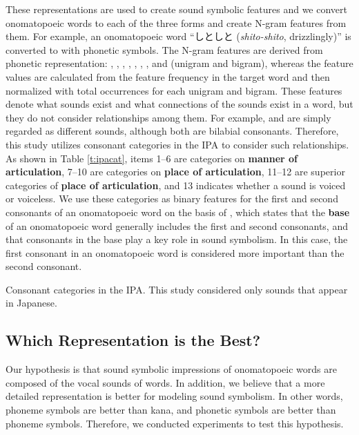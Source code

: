 \documentclass[english]{jnlp_1.4}
\begin{document}
These representations are used to create sound symbolic features and
we convert onomatopoeic words to each of the three forms and create N-gram features from them.
For example, an onomatopoeic word ``しとしと ({\it shito-shito}, drizzlingly)'' is converted to \textipa{[SitoSito]} with phonetic symbols.
The N-gram features are derived from phonetic representation:
\textipa{[S]}, \textipa{[i]}, \textipa{[t]}, \textipa{[o]}, \textipa{[Si]}, \textipa{[it]}, \textipa{[to]}, and \textipa{[oS]} (unigram and bigram),
whereas the feature values are calculated from the feature frequency in the target word and then normalized with total occurrences for each unigram and bigram.
These features denote what sounds exist and what connections of the sounds exist in a word, but they do not consider relationships among them.
For example, \textipa{[m]} and \textipa{[p]} are simply regarded as different sounds, although both are bilabial consonants.
Therefore, this study utilizes consonant categories in the IPA to consider such relationships.
As shown in Table \ref{t:ipacat}, items 1--6 are categories on {\bf manner of articulation}, 7--10 are categories on {\bf place of articulation},
11--12 are superior categories of {\bf place of articulation}, and 13 indicates whether a sound is voiced or voiceless.
We use these categories as binary features for the first and second consonants of an onomatopoeic word on the basis of \cite{hamano1998}, which states that
the {\bf base} of an onomatopoeic word generally includes the first and second consonants, and that consonants in the base play a key role in sound symbolism.
In this case, the first consonant in an onomatopoeic word is considered more important than the second consonant.

\begin{table}[t]
\caption{Consonant categories in the IPA. This study considered only sounds that appear in Japanese.}
\label{t:ipacat}

\end{table}


\subsection{Which Representation is the Best?}
\label{s:ssm}

Our hypothesis is that sound symbolic impressions of onomatopoeic words are composed of the vocal sounds of words.
In addition, we believe that a more detailed representation is better for modeling sound symbolism.
In other words, phoneme symbols are better than kana, and phonetic symbols are better than phoneme symbols.
Therefore, we conducted experiments to test this hypothesis.
\end{document}
